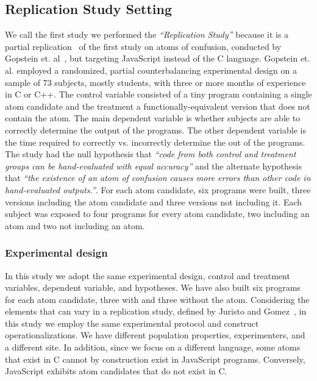 \subsection{Replication Study Setting}\label{sec:meth:replication}

We call the first study we performed the \textit{``Replication Study''} because it is a partial replication~\cite{Juristo2012} of the first study on atoms of confusion, conducted by Gopstein et. al~\cite{DBLP:conf/sigsoft/GopsteinIYDZYC17}, but targeting JavaScript instead of the C language. Gopstein et. al. employed a randomized, partial counterbalancing experimental design on a sample of 73 subjects, mostly students, with three or more months of experience in C or C++. The control variable consisted of a tiny program containing a single atom candidate and the treatment a functionally-equivalent version that does not contain the atom. The main dependent variable is whether subjects are able to correctly determine the output of the programs. The other dependent variable is the time required to correctly vs. incorrectly determine the out of the programs. The study had the null hypothesis that \textit{``code from both control and treatment groups can be hand-evaluated with equal accuracy''} and the alternate hypothesis that \textit{``the existence of an atom of confusion causes more errors than other code in hand-evaluated outputs.''}. For each atom candidate, six programs were built, three versions including the atom candidate and three versions not including it. Each subject was exposed to four programs for every atom candidate, two including an atom and two not including an atom.  

\subsubsection*{Experimental design} 

In this study we adopt the same experimental design, control and treatment variables, dependent variable, and hypotheses. We have also built six programs for each atom candidate, three with and three without the atom. Considering the elements that can vary in a replication study, defined by Juristo and Gomez~\cite{Juristo2012}, in this study we employ the same experimental protocol and construct operationalizations. We have different population properties, experimenters, and a different site. In addition, since we focus on a different language, some atoms that exist in C cannot by construction exist in JavaScript programs. Conversely, JavaScript exhibits atom candidates that do not exist in C. 

